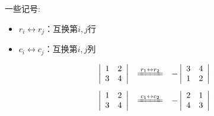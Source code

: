 \documentclass[10pt,a4paper%
tablecaptionabove]{article}
\begin{document}
\begin{CJK}{UTF8}{gkai}
  \begin{zhu}一些记号:
    \begin{itemize}
    \item $r_i \leftrightarrow r_j $：互换第$i,j$行 \\[0.1in]
    \item $c_i \leftrightarrow c_j $：互换第$i,j$列
    \end{itemize}
  \end{zhu}
  \begin{li}
    $$
    \begin{array}{rcl}
      \left|
      \begin{array}{ccc}
        1 & 2  \\
        3 & 4  \\
      \end{array}
      \right|
          &\xlongequal[]{r_1\leftrightarrow r_2}&
                                                  -\left|
                                                  \begin{array}{ccc}
                                                    3 & 4 \\
                                                    1 & 2 
                                                  \end{array}
                                                        \right|    \\[0.2in]
      \left|
      \begin{array}{ccc}
        1 & 2  \\
        3 & 4  
      \end{array}
            \right|
          &\xlongequal[]{c_1\leftrightarrow c_2}&
                                                  -\left|
                                                  \begin{array}{ccc}
                                                    2 & 1  \\
                                                    4 & 3  
                                                  \end{array}
                                                        \right|    
    \end{array}
    $$    
  \end{li}


\end{CJK}
\end{document}
